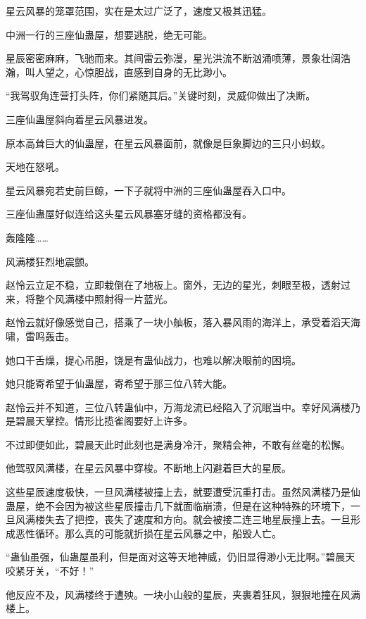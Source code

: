 
\begin{this_body}



星云风暴的笼罩范围，实在是太过广泛了，速度又极其迅猛。

中洲一行的三座仙蛊屋，想要逃脱，绝无可能。

星辰密密麻麻，飞驰而来。其间雷云弥漫，星光洪流不断汹涌喷薄，景象壮阔浩瀚，叫人望之，心惊胆战，直感到自身的无比渺小。

“我驾驭角连营打头阵，你们紧随其后。”关键时刻，灵威仰做出了决断。

三座仙蛊屋斜向着星云风暴进发。

原本高耸巨大的仙蛊屋，在星云风暴面前，就像是巨象脚边的三只小蚂蚁。

天地在怒吼。

星云风暴宛若史前巨鲸，一下子就将中洲的三座仙蛊屋吞入口中。

三座仙蛊屋好似连给这头星云风暴塞牙缝的资格都没有。

轰隆隆……

风满楼狂烈地震颤。

赵怜云立足不稳，立即栽倒在了地板上。窗外，无边的星光，刺眼至极，透射过来，将整个风满楼中照射得一片蓝光。

赵怜云就好像感觉自己，搭乘了一块小舢板，落入暴风雨的海洋上，承受着滔天海啸，雷鸣轰击。

她口干舌燥，提心吊胆，饶是有蛊仙战力，也难以解决眼前的困境。

她只能寄希望于仙蛊屋，寄希望于那三位八转大能。

赵怜云并不知道，三位八转蛊仙中，万海龙流已经陷入了沉眠当中。幸好风满楼乃是碧晨天掌控。情形比揽雀阁要好上许多。

不过即便如此，碧晨天此时此刻也是满身冷汗，聚精会神，不敢有丝毫的松懈。

他驾驭风满楼，在星云风暴中穿梭。不断地上闪避着巨大的星辰。

这些星辰速度极快，一旦风满楼被撞上去，就要遭受沉重打击。虽然风满楼乃是仙蛊屋，绝不会因为被这些星辰撞击几下就面临崩溃，但是在这种特殊的环境下，一旦风满楼失去了把控，丧失了速度和方向。就会被接二连三地星辰撞上去。一旦形成恶性循环。那么真的可能就折损在星云风暴之中，船毁人亡。

“蛊仙虽强，仙蛊屋虽利，但是面对这等天地神威，仍旧显得渺小无比啊。”碧晨天咬紧牙关，“不好！”

他反应不及，风满楼终于遭殃。一块小山般的星辰，夹裹着狂风，狠狠地撞在风满楼上。


\end{this_body}
